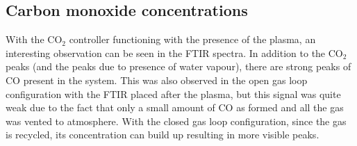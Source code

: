 







\subsection{Carbon monoxide concentrations}

With the CO$_2$ controller functioning with the presence of the plasma, an interesting observation can be seen in the FTIR spectra. In addition to the CO$_2$ peaks (and the peaks due to presence of water vapour), there are strong peaks of CO present in the system. This was also observed in the open gas loop configuration with the FTIR placed after the plasma, but this signal was quite weak due to the fact that only a small amount of CO as formed and all the gas was vented to atmosphere. With the closed gas loop configuration, since the gas is recycled, its concentration can build up resulting in more visible peaks. 

